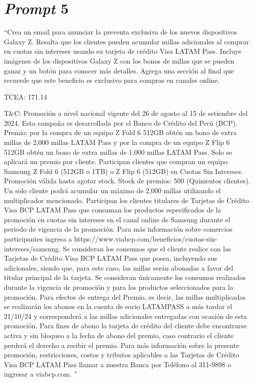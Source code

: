 \section{\textit{Prompt} 5}

``Crea un email para anunciar la preventa exclusiva de los nuevos dispositivos Galaxy Z. Resalta que los clientes pueden acumular millas adicionales al comprar en cuotas sin intereses usando su tarjeta de crédito Visa LATAM Pass. Incluye imágenes de los dispositivos Galaxy Z con los bonos de millas que se pueden ganar y un botón para conocer más detalles. Agrega una sección al final que recuerde que este beneficio es exclusivo para compras en canales online.

TCEA: 171.14%

T\&C: Promoción a nivel nacional vigente del 26 de agosto al 15 de setiembre del 2024. Esta campaña es desarrollada por el Banco de Crédito del Perú (BCP). Premio: por la compra de un equipo Z Fold 6 512GB obtén un bono de extra millas de 2,000 millas LATAM Pass y por la compra de un equipo Z Flip 6 512GB obtén un bono de extra millas de 1,000 millas LATAM Pass. Solo se aplicará un premio por cliente. Participan clientes que compran un equipo Samsung Z Fold 6 (512GB o 1TB) o Z Flip 6 (512GB) en Cuotas Sin Intereses. Promoción válida hasta agotar stock. Stock de premios: 500 (Quinientos clientes). Un solo cliente podrá acumular un máximo de 2,000 millas utilizando el multiplicador mencionado. Participan los clientes titulares de Tarjetas de Crédito Visa BCP LATAM Pass que consuman los productos especificados de la promoción en cuotas sin intereses en el canal online de Samsung durante el periodo de vigencia de la promoción. Para más información sobre comercios participantes ingresa a https://www.viabcp.com/beneficios/cuotas-sin-intereses/samsung. Se consideran los consumos que el cliente realice con las Tarjetas de Crédito Visa BCP LATAM Pass que posea, incluyendo sus adicionales, siendo que, para este caso, las millas serán abonadas a favor del titular principal de la tarjeta. Se consideran únicamente los consumos realizados durante la vigencia de promoción y para los productos seleccionados para la promoción. Para efectos de entrega del Premio, es decir, las millas multiplicadas se realizarán los abonos en la cuenta de socio LATAMPASS a más tardar el 21/10/24 y corresponderá a las millas adicionales entregadas con ocasión de esta promoción. Para fines de abono la tarjeta de crédito del cliente debe encontrarse activa y sin bloqueo a la fecha de abono del premio, caso contrario el cliente perderá el derecho a recibir el premio. Para más información sobre la presente promoción, restricciones, costos y tributos aplicables a las Tarjetas de Crédito Visa BCP LATAM Pass llamar a nuestra Banca por Teléfono al 311-9898 o ingresar a viabcp.com.
''

